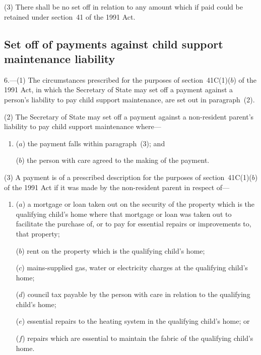 \documentclass[12pt,a4paper]{article}
\begin{document}
(3) There shall be no set off in relation to any amount which if paid could be retained under section~41 of the 1991 Act.


\subsection[6. Set off of payments against child support maintenance liability]{Set off of payments against child support maintenance liability}

6.---(1)  The circumstances prescribed for the purposes of section~41C(1)($b$)  of the 1991 Act, in which the 
Secretary of State  %
may set off a payment against a person’s liability to pay child support maintenance, are set out in paragraph~(2).

(2) The 
Secretary of State  %
may set off a payment against a non-resident parent’s liability to pay child support maintenance where—
\begin{enumerate}\item[]
($a$) the payment falls within paragraph~(3); and

($b$) the person with care agreed to the making of the payment.
\end{enumerate}

(3) A payment is of a prescribed description for the purposes of section~41C(1)($b$)  of the 1991 Act if it was made by the non-resident parent in respect of—
\begin{enumerate}\item[]
($a$) a mortgage or loan taken out on the security of the property which is the qualifying child’s home where that mortgage or loan was taken out to facilitate the purchase of, or to pay for essential repairs or improvements to, that property;

($b$) rent on the property which is the qualifying child’s home;

($c$) mains-supplied gas, water or electricity charges at the qualifying child’s home;

($d$) council tax payable by the person with care in relation to the qualifying child’s home;

($e$) essential repairs to the heating system in the qualifying child’s home; or

($f$) repairs which are essential to maintain the fabric of the qualifying child’s home.
\end{enumerate}
\end{document}
